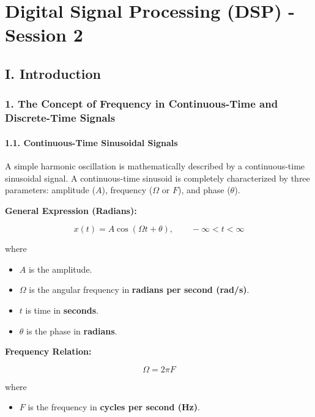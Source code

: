 \section{Digital Signal Processing (DSP) - Session
2}\label{digital-signal-processing-dsp---session-2}

\subsection{I. Introduction}\label{i.-introduction}

\subsubsection{1. The Concept of Frequency in Continuous-Time and
Discrete-Time
Signals}\label{the-concept-of-frequency-in-continuous-time-and-discrete-time-signals}

\paragraph{1.1. Continuous-Time Sinusoidal
Signals}\label{continuous-time-sinusoidal-signals}

A simple harmonic oscillation is mathematically described by a
continuous-time sinusoidal signal. A continuous-time sinusoid is
completely characterized by three parameters: amplitude (\(A\)),
frequency (\(\Omega\) or \(F\)), and phase (\(\theta\)).

\textbf{General Expression (Radians):}

\[  
x(t)=A\cos(\Omega t+\theta),  
\qquad -\infty<t<\infty  
\]

where

\begin{itemize}
\tightlist
\item
  \(A\) is the amplitude.
\item
  \(\Omega\) is the angular frequency in \textbf{radians per second
  (rad/s)}.
\item
  \(t\) is time in \textbf{seconds}.
\item
  \(\theta\) is the phase in \textbf{radians}.
\end{itemize}

\textbf{Frequency Relation:}

\[  
\Omega = 2\pi F  
\]

where

\begin{itemize}
\tightlist
\item
  \(F\) is the frequency in \textbf{cycles per second (Hz)}.
\end{itemize}


